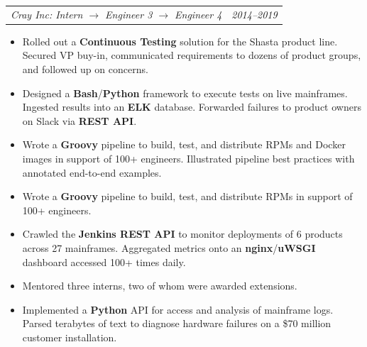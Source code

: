 \documentclass[12pt,letterpaper]{article}
\makeatletter
\newcommand{\headerpair}[2]{
    \begin{tabular*}{\linewidth}{l@{ \extracolsep{\fill} }r} {\large\emph{#1}} & {\large\emph{#2}}
    \end{tabular*}
}
\newcommand{\headerrow}[3]{\headerpair{#2: #1}{#3}}
\makeatother
\begin{document}
\headerrow
    {Intern $\to$ Engineer 3 $\to$ Engineer 4}
    {Cray Inc}
    {2014--2019}
\begin{itemize}
    \item Rolled out a \textbf{Continuous Testing} solution for the Shasta product line. Secured VP buy-in, communicated requirements to dozens of product groups, and followed up on concerns.
    \item Designed a \textbf{Bash}/\textbf{Python} framework to execute tests on live mainframes. Ingested results into an \textbf{ELK} database. Forwarded failures to product owners on Slack via \textbf{REST API}.
    \item Wrote a \textbf{Groovy} pipeline to build, test, and distribute RPMs and Docker images in support of 100+ engineers. Illustrated pipeline best practices with annotated end-to-end examples.
    \item Wrote a \textbf{Groovy} pipeline to build, test, and distribute RPMs in support of 100+ engineers.
    \item Crawled the \textbf{Jenkins REST API} to monitor deployments of 6 products across 27 mainframes. Aggregated metrics onto an \textbf{nginx}/\textbf{uWSGI} dashboard accessed 100+ times daily.
    \item Mentored three interns, two of whom were awarded extensions.
    \item Implemented a \textbf{Python} API for access and analysis of mainframe logs. Parsed terabytes of text to diagnose hardware failures on a \$70 million customer installation.










\end{itemize}
\end{document}
